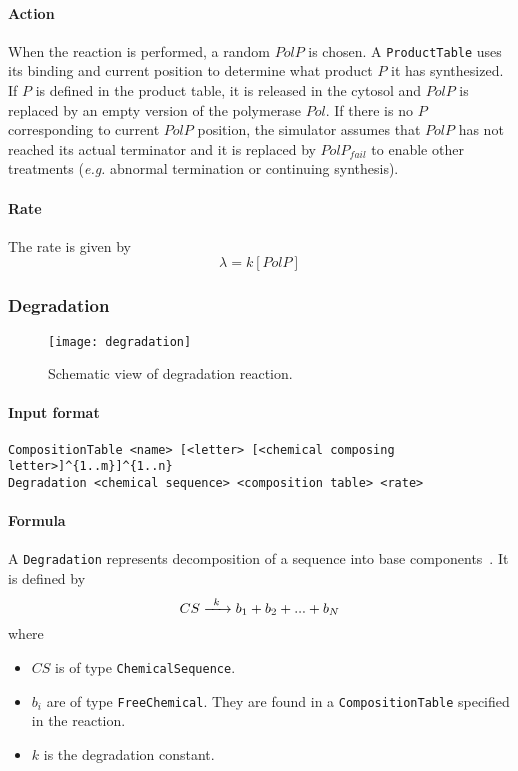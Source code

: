 \paragraph{Action} When the reaction is performed, a random $PolP$ is chosen. A \texttt{ProductTable} uses its binding and current position to determine what product $P$ it has synthesized. If $P$ is defined in the product table, it is released in the cytosol and $PolP$ is replaced by an empty version of the polymerase $Pol$. If there is no $P$ corresponding to current $PolP$ position, the simulator assumes that $PolP$ has not reached its actual terminator and it is replaced by $PolP_{fail}$ to enable other treatments (\textit{e.g.} abnormal termination or continuing synthesis).

\paragraph{Rate} The rate is given by
\[
\lambda = k[PolP]
\]

\subsubsection{Degradation}

\begin{figure}[!h]
  \centering
  \texttt{[image: degradation]}
  \caption{Schematic view of degradation reaction.}
  \label{fig:degradation}
\end{figure}

\paragraph{Input format}
\begin{verbatim}
CompositionTable <name> [<letter> [<chemical composing letter>]^{1..m}]^{1..n}
Degradation <chemical sequence> <composition table> <rate>	
\end{verbatim}

\paragraph{Formula} A \texttt{Degradation} represents decomposition of a sequence into base components~. It is defined by
\[
\reactionIrr{CS}{b_1 + b_2 + ... + b_N}{k}{}
\]
where
\begin{itemize}
	\item $CS$ is of type \texttt{ChemicalSequence}.
	\item $b_i$ are of type \texttt{FreeChemical}. They are found in a \texttt{CompositionTable} specified in the reaction.
	\item $k$ is the degradation constant.
\end{itemize}

